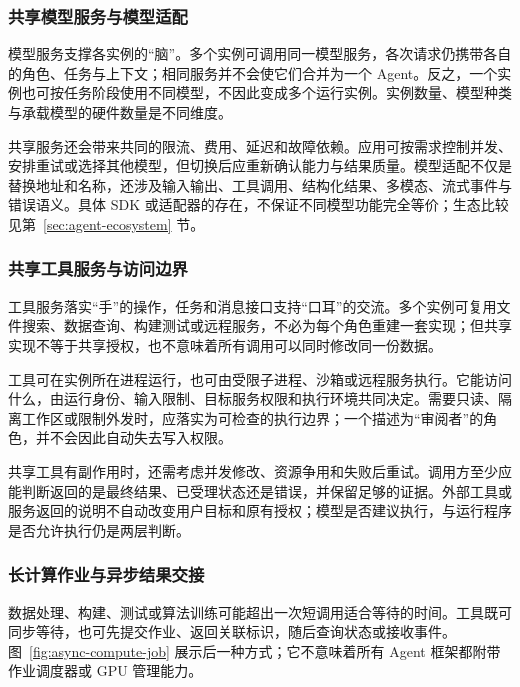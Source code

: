 \documentclass[11pt,a4paper]{article}
\begin{document}
\subsubsection{共享模型服务与模型适配}

模型服务支撑各实例的“脑”。多个实例可调用同一模型服务，各次请求仍携带各自的角色、任务与上下文；相同服务并不会使它们合并为一个 Agent。反之，一个实例也可按任务阶段使用不同模型，不因此变成多个运行实例。实例数量、模型种类与承载模型的硬件数量是不同维度。

共享服务还会带来共同的限流、费用、延迟和故障依赖。应用可按需求控制并发、安排重试或选择其他模型，但切换后应重新确认能力与结果质量。模型适配不仅是替换地址和名称，还涉及输入输出、工具调用、结构化结果、多模态、流式事件与错误语义。具体 SDK 或适配器的存在，不保证不同模型功能完全等价；生态比较见第~\ref{sec:agent-ecosystem} 节。

\subsubsection{共享工具服务与访问边界}

工具服务落实“手”的操作，任务和消息接口支持“口耳”的交流。多个实例可复用文件搜索、数据查询、构建测试或远程服务，不必为每个角色重建一套实现；但共享实现不等于共享授权，也不意味着所有调用可以同时修改同一份数据。

工具可在实例所在进程运行，也可由受限子进程、沙箱或远程服务执行。它能访问什么，由运行身份、输入限制、目标服务权限和执行环境共同决定。需要只读、隔离工作区或限制外发时，应落实为可检查的执行边界；一个描述为“审阅者”的角色，并不会因此自动失去写入权限。

共享工具有副作用时，还需考虑并发修改、资源争用和失败后重试。调用方至少应能判断返回的是最终结果、已受理状态还是错误，并保留足够的证据。外部工具或服务返回的说明不自动改变用户目标和原有授权；模型是否建议执行，与运行程序是否允许执行仍是两层判断。

\subsubsection{长计算作业与异步结果交接}

数据处理、构建、测试或算法训练可能超出一次短调用适合等待的时间。工具既可同步等待，也可先提交作业、返回关联标识，随后查询状态或接收事件。图~\ref{fig:async-compute-job} 展示后一种方式；它不意味着所有 Agent 框架都附带作业调度器或 GPU 管理能力。
\end{document}
